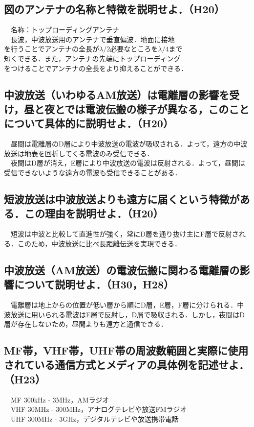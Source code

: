 \subsection{図のアンテナの名称と特徴を説明せよ．（H20）}
　名称：トップローディングアンテナ\\
　長波，中波放送用のアンテナで垂直偏波．地面に接地\\
を行うことでアンテナの全長が$\lambda / 2$必要なところを$\lambda / 4$まで\\
短くできる．また，アンテナの先端にトップローディング\\
をつけることでアンテナの全長をより抑えることができる．\\

\subsection{中波放送（いわゆるAM放送）は電離層の影響を受け，昼と夜とでは電波伝搬の様子が異なる，このことについて具体的に説明せよ．（H20）}
　昼間は電離層のD層により中波放送の電波が吸収される．よって，遠方の中波放送は地表を回折してくる電波のみ受信できる．\\
　夜間はD層が消え，E層により中波放送の電波は反射される．よって，昼間は受信できないような遠方の電波も受信できることがある．\\

\subsection{短波放送は中波放送よりも遠方に届くという特徴がある．この理由を説明せよ．（H20）}
　短波は中波と比較して直進性が強く，常にD層を通り抜け主にF層で反射される．このため，中波放送に比べ長距離伝送を実現できる．\\

\subsection{中波放送（AM放送）の電波伝搬に関わる電離層の影響について説明せよ．（H30，H28）}
　電離層は地上からの位置が低い層から順にD層，E層，F層に分けられる．中波放送に用いられる電波はE層で反射し，D層で吸収される．しかし，夜間はD層が存在しないため，昼間よりも遠方と通信できる．\\

\subsection{MF帯，VHF帯，UHF帯の周波数範囲と実際に使用されている通信方式とメディアの具体例を記述せよ．（H23）}
　MF 300kHz - 3MHz，AMラジオ\\
　VHF 30MHz - 300MHz，アナログテレビや放送FMラジオ\\
　UHF 300MHz - 3GHz，デジタルテレビや放送携帯電話\\

